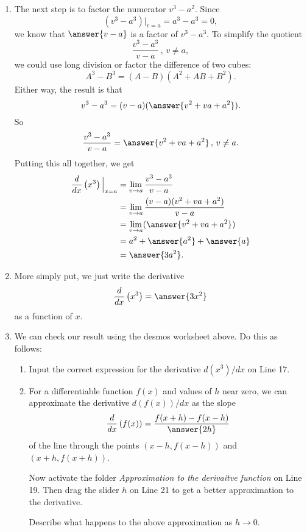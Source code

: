 \documentclass{ximera}
\begin{document}
\begin{exploration}
\begin{enumerate}
\item The next step is to factor the numerator $v^3-a^2$. Since 
\[
     (v^3 - a^3)\Big|_{v=a} = a^3 - a^3 = 0 ,
\]
we know that $\answer{v-a}$ is a factor of $v^3-a^3$. To simplify the quotient
\[
  \frac{v^3-a^3}{v-a} \, , \, v\neq a,
\]
we could use long division or factor the difference of two cubes:
\[
   A^3 - B^3 = (A-B)(A^2 + AB + B^2).
\]
Either way, the result is that
\[
     v^3 - a^3 = (v-a)(\answer{v^2 + va + a^2}).
\]
So
\[
   \frac{v^3-a^3}{v-a} = \answer{v^2+va+a^2} \, , \, v\neq a.
\]
Putting this all together, we get
\begin{align*}
\frac{d}{dx}\left( x^3 \right)\Big|_{x=a}  & = \lim_{v\to a} \frac{v^3-a^3}{v-a} \\
                                                              &= \lim_{v\to a} \frac{(v-a)(v^2+va+a^2)}{v-a} \\
                                                             & = \lim_{v\to a}(\answer{v^2 + va + a^2}) \\
                                                            & = a^2 + \answer{a^2} + \answer{a} \\
                                                            & = \answer{3a^2} .
\end{align*}

\item More simply put, we just write the derivative
\[
   \frac{d}{dx}\left( x^3  \right) = \answer{3x^2}
\]
as a function of $x$.

\item We can check our result using the desmos worksheet above. Do this as follows:

\begin{enumerate}

\item Input the correct expression for the derivative $d(x^3)/dx$ on Line 17.

\item For a differentiable function $f(x)$ and values of $h$ near zero, we can approximate the derivative $d(f(x))/dx$ as the slope
\[
  \frac{d}{dx}\left( f(x)  \right) = \frac{f(x+h) - f(x-h)}{\answer{2h}}
\]
of the line through the points $(x-h, f(x-h))$ and $(x+h, f(x+h))$.

Now activate the folder \emph{Approximation to the derivaitve function} on Line 19. Then drag the slider $h$ on Line 21 to get a better approximation to the derivative.

\begin{freeResponse}
Describe what happens to the above approximation as $h \to 0$.
\end{freeResponse}

\end{enumerate}
\end{enumerate}
\end{exploration}
\end{document}
